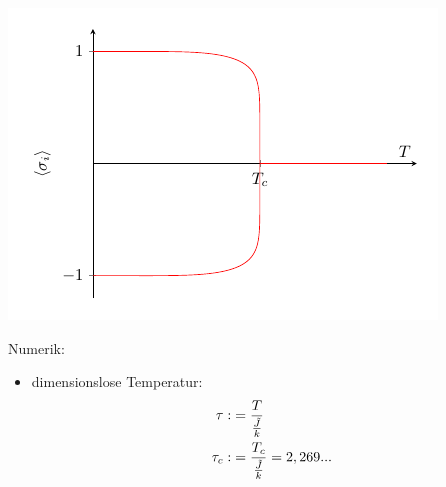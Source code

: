 \begin{center}
\includegraphics{Tikz Standalone/Tikz_spin.pdf}
\end{center}

Numerik:
\begin{itemize}
    \item dimensionslose Temperatur:
    \begin{align}
        \tau :&= \frac{T}{\frac{\Tilde{J}}{k}}\\
        \tau_c :&= \frac{T_c}{\frac{\Tilde{J}}{k}} = 2,269...
    \end{align}
\end{itemize}